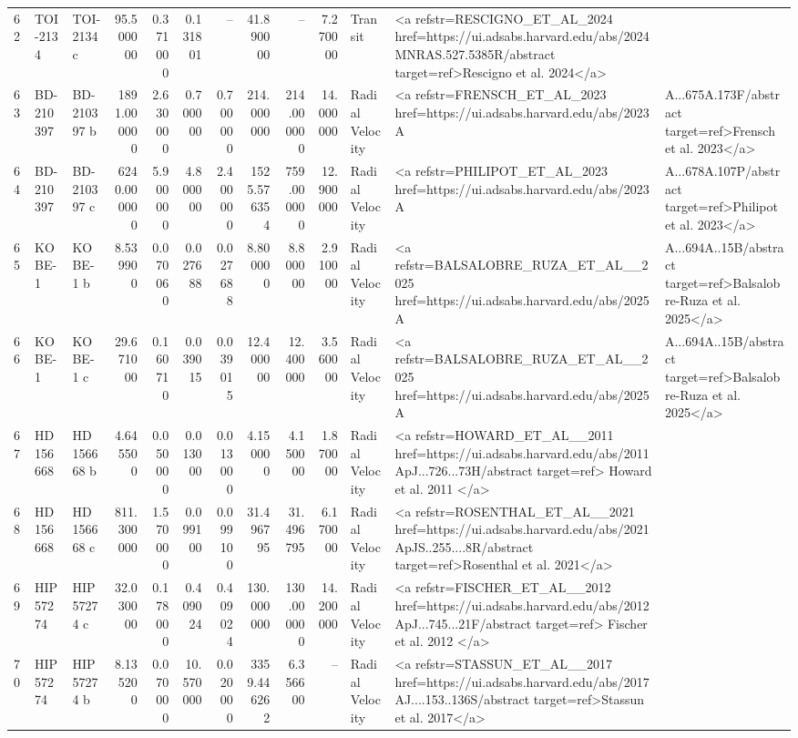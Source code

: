 \begin{tabular}{lllrrrrrrrll}
62 & TOI-2134 & TOI-2134 c & 95.500000 & 0.371000 & 0.131801 & -- & 41.890000 & -- & 7.270000 & Transit & <a refstr=RESCIGNO_ET_AL_2024 href=https://ui.adsabs.harvard.edu/abs/2024MNRAS.527.5385R/abstract target=ref>Rescigno et al. 2024</a> \\
63 & BD-210397 & BD-210397 b & 1891.000000 & 2.630000 & 0.700000 & 0.700000 & 214.000000 & 214.000000 & 14.000000 & Radial Velocity & <a refstr=FRENSCH_ET_AL_2023 href=https://ui.adsabs.harvard.edu/abs/2023A&A...675A.173F/abstract target=ref>Frensch et al. 2023</a> \\
64 & BD-210397 & BD-210397 c & 6240.000000 & 5.900000 & 4.800000 & 2.400000 & 1525.576354 & 759.000000 & 12.900000 & Radial Velocity & <a refstr=PHILIPOT_ET_AL_2023 href=https://ui.adsabs.harvard.edu/abs/2023A&A...678A.107P/abstract target=ref>Philipot et al. 2023</a> \\
65 & KOBE-1 & KOBE-1 b & 8.539900 & 0.070060 & 0.027688 & 0.027688 & 8.800000 & 8.800000 & 2.910000 & Radial Velocity & <a refstr=BALSALOBRE_RUZA_ET_AL__2025 href=https://ui.adsabs.harvard.edu/abs/2025A&A...694A..15B/abstract target=ref>Balsalobre-Ruza et al. 2025</a> \\
66 & KOBE-1 & KOBE-1 c & 29.671000 & 0.160710 & 0.039015 & 0.039015 & 12.400000 & 12.400000 & 3.560000 & Radial Velocity & <a refstr=BALSALOBRE_RUZA_ET_AL__2025 href=https://ui.adsabs.harvard.edu/abs/2025A&A...694A..15B/abstract target=ref>Balsalobre-Ruza et al. 2025</a> \\
67 & HD 156668 & HD 156668 b & 4.645500 & 0.050000 & 0.013000 & 0.013000 & 4.150000 & 4.150000 & 1.870000 & Radial Velocity & <a refstr=HOWARD_ET_AL__2011 href=https://ui.adsabs.harvard.edu/abs/2011ApJ...726...73H/abstract target=ref> Howard et al. 2011 </a> \\
68 & HD 156668 & HD 156668 c & 811.300000 & 1.570000 & 0.099100 & 0.099100 & 31.496795 & 31.496795 & 6.170000 & Radial Velocity & <a refstr=ROSENTHAL_ET_AL__2021 href=https://ui.adsabs.harvard.edu/abs/2021ApJS..255....8R/abstract target=ref>Rosenthal et al. 2021</a> \\
69 & HIP 57274 & HIP 57274 c & 32.030000 & 0.178000 & 0.409024 & 0.409024 & 130.000000 & 130.000000 & 14.200000 & Radial Velocity & <a refstr=FISCHER_ET_AL__2012 href=https://ui.adsabs.harvard.edu/abs/2012ApJ...745...21F/abstract target=ref> Fischer et al. 2012 </a> \\
70 & HIP 57274 & HIP 57274 b & 8.135200 & 0.070000 & 10.570000 & 0.020000 & 3359.446262 & 6.356600 & -- & Radial Velocity & <a refstr=STASSUN_ET_AL__2017 href=https://ui.adsabs.harvard.edu/abs/2017AJ....153..136S/abstract target=ref>Stassun et al. 2017</a> \\

\end{tabular}

